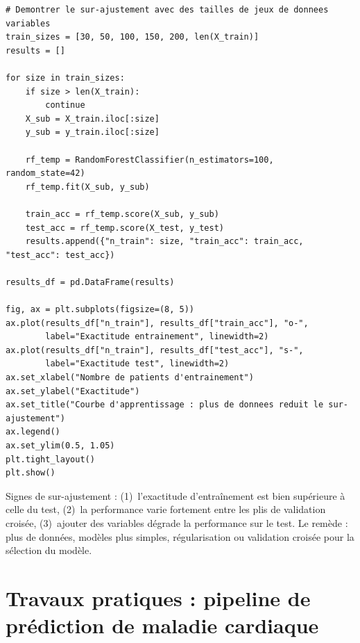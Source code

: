 \begin{verbatim}
# Demontrer le sur-ajustement avec des tailles de jeux de donnees variables
train_sizes = [30, 50, 100, 150, 200, len(X_train)]
results = []

for size in train_sizes:
    if size > len(X_train):
        continue
    X_sub = X_train.iloc[:size]
    y_sub = y_train.iloc[:size]

    rf_temp = RandomForestClassifier(n_estimators=100, random_state=42)
    rf_temp.fit(X_sub, y_sub)

    train_acc = rf_temp.score(X_sub, y_sub)
    test_acc = rf_temp.score(X_test, y_test)
    results.append({"n_train": size, "train_acc": train_acc, "test_acc": test_acc})

results_df = pd.DataFrame(results)

fig, ax = plt.subplots(figsize=(8, 5))
ax.plot(results_df["n_train"], results_df["train_acc"], "o-",
        label="Exactitude entrainement", linewidth=2)
ax.plot(results_df["n_train"], results_df["test_acc"], "s-",
        label="Exactitude test", linewidth=2)
ax.set_xlabel("Nombre de patients d'entrainement")
ax.set_ylabel("Exactitude")
ax.set_title("Courbe d'apprentissage : plus de donnees reduit le sur-ajustement")
ax.legend()
ax.set_ylim(0.5, 1.05)
plt.tight_layout()
plt.show()
\end{verbatim}

\begin{pythontip}
Signes de sur-ajustement : (1)~l'exactitude d'entra\^inement est bien sup\'erieure \`a celle du test, (2)~la performance varie fortement entre les plis de validation crois\'ee, (3)~ajouter des variables d\'egrade la performance sur le test. Le rem\`ede : plus de donn\'ees, mod\`eles plus simples, r\'egularisation ou validation crois\'ee pour la s\'election du mod\`ele.
\end{pythontip}

\section{Travaux pratiques : pipeline de pr\'ediction de maladie cardiaque}

